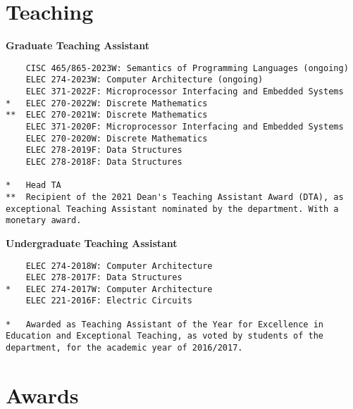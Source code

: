 \documentclass[margin]{res}
\begin{document}
\begin{resume}

\section{Teaching}

\textbf{Graduate Teaching Assistant}

\begin{lstlisting}
    CISC 465/865-2023W: Semantics of Programming Languages (ongoing)
    ELEC 274-2023W: Computer Architecture (ongoing)
    ELEC 371-2022F: Microprocessor Interfacing and Embedded Systems
*   ELEC 270-2022W: Discrete Mathematics
**  ELEC 270-2021W: Discrete Mathematics
    ELEC 371-2020F: Microprocessor Interfacing and Embedded Systems
    ELEC 270-2020W: Discrete Mathematics
    ELEC 278-2019F: Data Structures
    ELEC 278-2018F: Data Structures

*   Head TA
**  Recipient of the 2021 Dean's Teaching Assistant Award (DTA), as exceptional Teaching Assistant nominated by the department. With a monetary award.
\end{lstlisting}

\textbf{Undergraduate Teaching Assistant}

\begin{lstlisting}
    ELEC 274-2018W: Computer Architecture
    ELEC 278-2017F: Data Structures
*   ELEC 274-2017W: Computer Architecture
    ELEC 221-2016F: Electric Circuits

*   Awarded as Teaching Assistant of the Year for Excellence in Education and Exceptional Teaching, as voted by students of the department, for the academic year of 2016/2017.
\end{lstlisting}


\section{Awards}



\end{resume}
\end{document}
